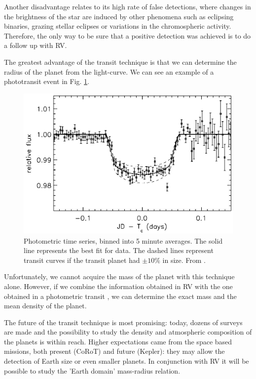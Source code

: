 \documentclass[dvips,12pt,a4paper]{report}
\begin{document}
Another disadvantage relates to its high rate of false detections, where changes in the brightness of the star are induced by other phenomena such as eclipsing binaries, grazing stellar eclipses or variations in the chromospheric activity. Therefore, the only way to be sure that a positive detection was achieved is to do a follow up with RV.

The greatest advantage of the transit technique is that we can determine the radius of the planet from the light-curve. We can see an example of a phototransit event in Fig. \ref{photot}.

\begin{figure}[h]
\centering
\includegraphics[trim=0cm 0.5cm 0cm 0.4cm,clip,height=5 cm]{pics/phototransit}
\caption[Example of a phototransit event]{Photometric time series, binned into 5 minute averages. The solid line represents the best fit for data. The dashed lines represent transit curves if the transit planet had $\pm10\%$ in size. From \citet{Charbonneau-2000}.}
\label{photot}
\end{figure}

Unfortunately, we cannot acquire the mass of the planet with this technique alone. However, if we combine the information obtained in RV with the one obtained in a photometric transit \citep{Charbonneau-2000}, we can determine the exact mass and the mean density of the planet.


The future of the transit technique is most promising: today, dozens of surveys are made and the possibility to study the density and atmospheric composition of the planets is within reach. Higher expectations came from the space based missions, both present (CoRoT) and future (Kepler): they may allow the detection of Earth size or even smaller planets. In conjunction with RV it will be possible to study the 'Earth domain' mass-radius relation.
\end{document}
